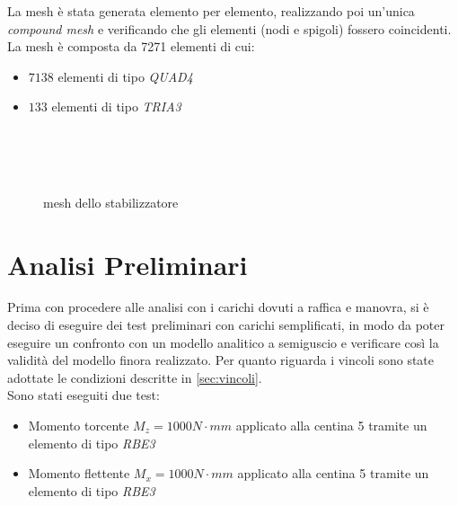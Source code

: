 \documentclass[
10pt, %
a4paper, %
oneside, %
headinclude,footinclude, %
BCOR5mm, %
]{scrartcl}
\begin{document}
La mesh è stata generata elemento per elemento, realizzando poi un'unica \emph{compound mesh} e verificando che gli elementi (nodi e spigoli) fossero coincidenti.
La mesh è composta da 7271 elementi di cui:

\begin{itemize}
	\item $7138$ elementi di tipo \emph{QUAD4}
	\item $133$ elementi di tipo \emph{TRIA3}
\end{itemize} 

\begin{figure}[htb]
	\centering
	 \\
	 \\
	 \\
	\caption[Mesh Stabilizzatore SF260]{mesh dello stabilizzatore} %
	\label{fig:mesh}
\end{figure}


\newpage


\section{Analisi Preliminari}

Prima con procedere alle analisi con i carichi dovuti a raffica e manovra, si è deciso di eseguire dei test preliminari con carichi semplificati, in modo da poter eseguire un confronto con un modello analitico a semiguscio e verificare così la validità del modello finora realizzato. Per quanto riguarda i vincoli sono state adottate le condizioni descritte in \ref{sec:vincoli}.\\
Sono stati eseguiti due test:

\begin{itemize}
	\item Momento torcente $M_z = 1000 N \cdot mm$ applicato alla centina 5 tramite un elemento di tipo \emph{RBE3}	
	\item Momento flettente $M_x = 1000 N \cdot mm$ applicato alla centina 5 tramite un elemento di tipo \emph{RBE3}
\end{itemize}
\end{document}
